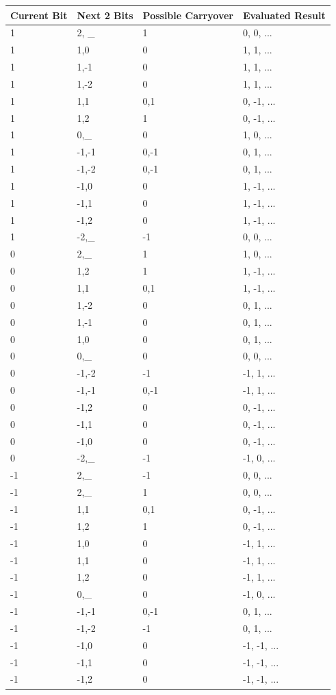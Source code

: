 \documentclass[12pt,twoside,notitlepage]{report}
\begin{document}
\begin{longtable}{| l | l | l | l |}
	\hline
    	Current Bit & Next 2 Bits & Possible Carryover & Evaluated Result \\ \hline
	1 & 2, \_ & 1 & 0, 0, ...\\ \hline
	1 & 1,0 & 0 & 1, 1, ...\\ \hline
	1 & 1,-1 & 0 & 1, 1, ...\\ \hline
	1 & 1,-2 & 0 & 1, 1, ...\\ \hline	
	1 & 1,1 & 0,1 & 0, -1, ...\\ \hline
	1 & 1,2 & 1 & 0, -1, ...\\ \hline
	1 & 0,\_ & 0 & 1, 0, ...\\ \hline
	1 & -1,-1 & 0,-1 & 0, 1, ...\\ \hline
	1 & -1,-2 & 0,-1 & 0, 1, ...\\ \hline
	1 & -1,0 & 0 & 1, -1, ...\\ \hline
	1 & -1,1 & 0 & 1, -1, ...\\ \hline
	1 & -1,2 & 0 & 1, -1, ...\\ \hline
	1 & -2,\_ & -1 & 0, 0, ...\\ \hline
	0 & 2,\_ & 1 & 1, 0, ...\\ \hline
	0 & 1,2 & 1 & 1, -1, ...\\ \hline
	0 & 1,1 & 0,1 & 1, -1, ...\\ \hline
	0 & 1,-2 & 0 & 0, 1, ...\\ \hline
	0 & 1,-1 & 0 & 0, 1, ...\\ \hline
	0 & 1,0 & 0 & 0, 1, ...\\ \hline
	0 & 0,\_ & 0 & 0, 0, ...\\ \hline
	0 & -1,-2 & -1 & -1, 1, ...\\ \hline
	0 & -1,-1 & 0,-1 & -1, 1, ...\\ \hline
	0 & -1,2 & 0 & 0, -1, ...\\ \hline
	0 & -1,1 & 0 & 0, -1, ...\\ \hline
	0 & -1,0 & 0 & 0, -1, ...\\ \hline
	0 & -2,\_ & -1 & -1, 0, ...\\ \hline
	-1 & 2,\_ & -1 & 0, 0, ...\\ \hline
	-1 & 2,\_ & 1 & 0, 0, ...\\ \hline
	-1 & 1,1 & 0,1 & 0, -1, ...\\ \hline
	-1 & 1,2 & 1 & 0, -1, ...\\ \hline
	-1 & 1,0 & 0 & -1, 1, ...\\ \hline
	-1 & 1,1 & 0 & -1, 1, ...\\ \hline
	-1 & 1,2 & 0 & -1, 1, ...\\ \hline
	-1 & 0,\_ & 0 & -1, 0, ...\\ \hline
	-1 & -1,-1 & 0,-1 & 0, 1, ...\\ \hline
	-1 & -1,-2 & -1 & 0, 1, ...\\ \hline
	-1 & -1,0 & 0 & -1, -1, ...\\ \hline
	-1 & -1,1 & 0 & -1, -1, ...\\ \hline
	-1 & -1,2 & 0 & -1, -1, ...\\ \hline

\end{longtable}
\end{document}
